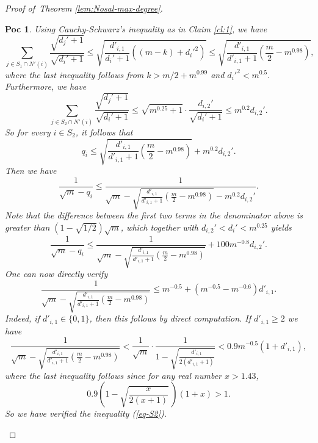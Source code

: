 \documentclass[10pt,a4paper]{amsart}
\newtheorem{poc}{Poc}
\begin{document}
\begin{proof}[Proof of~Theorem \ref{lem:Nosal-max-degree}]
\begin{poc}
Using Cauchy-Schwarz's inequality 
as in Claim \ref{cl:1}, we have
$$\sum_{j \in S_1 \cap N'(i)} \frac{\sqrt{d_j' + 1}}{\sqrt{d_i' + 1}} \leq \sqrt{ \frac{d'_{i,1}}{d_i' + 1} \left((m - k) + d_i'^2\right)} \leq 
\sqrt{ \frac{d'_{i,1}}{d'_{i,1} + 1} 
\left( \frac{m}{2} - m^{0.98} \right)},$$
where the last inequality follows from 
$k> m/2 + m^{0.99}$ and $d_i'^2 < m^{0.5}$. 
Furthermore, we have
$$\sum_{j \in S_2\cap N'(i)} \frac{\sqrt{d_j' + 1}}{\sqrt{d_i' + 1}} \leq \sqrt{m^{0.25} + 1} \cdot \frac{d_{i,2}'}{\sqrt{d_i' + 1}} \leq m^{0.2} d_{i,2}'.$$
So for every $i\in S_2$, it follows that  
\[ q_i \leq \sqrt{ \frac{d'_{i,1}}{d'_{i,1} + 1} 
\left( \frac{m}{2} - m^{0.98} \right)} + m^{0.2} d_{i,2}' . \]
Then we have
$$\frac{1}{\sqrt{m} - q_i} \leq \frac{1}{\sqrt{m} - \sqrt{\frac{d'_{i,1}}{d'_{i,1} + 1} 
\left( \frac{m}{2} - m^{0.98} \right)} - m^{0.2} d_{i,2}'}.$$ 
Note that the difference between the first two terms in the denominator above is greater than $(1 - \sqrt{1 / 2})\sqrt{m}$, 
which together with $d_{i,2}' < d_i' < m^{0.25}$ 
yields 
$$\frac{1}{\sqrt{m} - q_i} \leq 
\frac{1}{\sqrt{m} - \sqrt{\frac{d'_{i,1}}{d'_{i,1} + 1} 
\left( \frac{m}{2} - m^{0.98}\right)}} + 100m^{-0.8} d_{i,2}'.$$
One can now directly verify
$$\frac{1}{\sqrt{m} - \sqrt{\frac{d'_{i,1}}{d'_{i,1} + 1} 
\left( \frac{m}{2} - m^{0.98}\right)}} \leq 
m^{-0.5} + (m^{-0.5} - m^{-0.6}) d'_{i,1}.$$
Indeed, if $d'_{i,1} \in \{0, 1\}$, then this follows by direct computation. If $d'_{i,1} \geq 2$ we have
$$\frac{1}{\sqrt{m} - \sqrt{\frac{d'_{i,1}}{d'_{i,1} + 1} \left( \frac{m}{2} - m^{0.98} \right)}} 
<  \frac{1}{\sqrt{m}} \cdot \frac{1}{1 - \sqrt{\frac{d'_{i,1}}{2(d'_{i,1} + 1)}}} 
< 0.9 m^{-0.5} (1 + d'_{i,1}),$$
where the last inequality follows since for any real number $x> 1.43$, 
\[ 0.9\left( 1-\sqrt{\frac{x}{2(x+1)}}\, \right)(1+x) >1. \]  
So we have verified the inequality (\ref{eq-S2}).  
\end{poc}


\end{proof}
\end{document}
